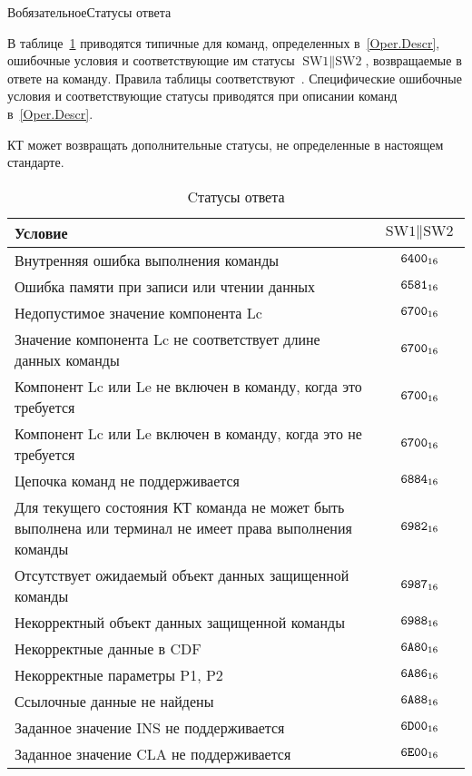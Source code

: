 \begin{appendix}{В}{обязательное}{Статусы ответа}
\label{ERRORS}

\mbox{}

В таблице~\ref{Table.Errors.General} приводятся типичные для команд, 
определенных в~\ref{Oper.Descr},
ошибочные условия и соответствующие им 
статусы $\text{SW1} \parallel \text{SW2}$,
возвращаемые в ответе на команду.
Правила таблицы соответствуют~\cite{APDU}.
%
Специфические ошибочные условия и соответствующие статусы приводятся 
при описании команд в~\ref{Oper.Descr}.

КТ может возвращать дополнительные статусы,
не определенные в настоящем стандарте.

\begin{table}[hbt]
\caption{Cтатусы ответа}
\label{Table.Errors.General}
\begin{tabular}{|p{14cm}|c|}
\hline
Условие & $\text{SW1} \parallel \text{SW2}$\\
\hline
\hline
Внутренняя ошибка выполнения команды & $\texttt{6400}_{16}$ \\
\hline
Ошибка памяти при записи или чтении данных & $\texttt{6581}_{16}$ \\
\hline
Недопустимое значение компонента Lc & $\texttt{6700}_{16}$ \\
\hline
Значение компонента Lc не соответствует длине данных команды& $\texttt{6700}_{16}$ \\
\hline
Компонент Lc или Le не включен в команду, 
когда это требуется& $\texttt{6700}_{16}$ \\
\hline
Компонент Lc или Le включен в команду, 
когда это не требуется& $\texttt{6700}_{16}$ \\
\hline
Цепочка команд не поддерживается & $\texttt{6884}_{16}$ \\
\hline
Для текущего состояния КТ команда не может быть выполнена
или терминал не имеет права выполнения команды & $\texttt{6982}_{16}$ \\
\hline
Отсутствует ожидаемый объект данных защищенной 
команды & $\texttt{6987}_{16}$ \\
\hline
Некорректный объект данных защищенной команды & $\texttt{6988}_{16}$ \\
\hline
Некорректные данные в CDF & $\texttt{6A80}_{16}$ \\
\hline
Некорректные параметры P1, P2 & $\texttt{6A86}_{16}$ \\
\hline
Ссылочные данные не найдены & $\texttt{6A88}_{16}$ \\
\hline
Заданное значение INS не поддерживается & $\texttt{6D00}_{16}$ \\
\hline
Заданное значение CLA не поддерживается & $\texttt{6E00}_{16}$ \\
\hline
\end{tabular}
\end{table}

\mbox{}
\vfill
\mbox{}
\clearpage

\end{appendix}